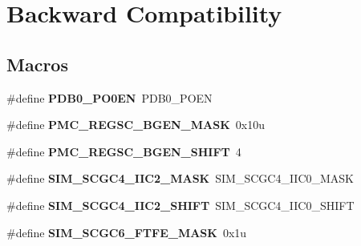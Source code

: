 \hypertarget{group___backward___compatibility___symbols}{}\section{Backward Compatibility}
\label{group___backward___compatibility___symbols}
\subsection*{Macros}
\begin{DoxyCompactItemize}
\item 
\hypertarget{group___backward___compatibility___symbols_gacdf65a1cbab2f9d234709ab34ae9a363}{}\#define {\bfseries P\+D\+B0\+\_\+\+P\+O0\+E\+N}~P\+D\+B0\+\_\+\+P\+O\+E\+N\label{group___backward___compatibility___symbols_gacdf65a1cbab2f9d234709ab34ae9a363}

\item 
\hypertarget{group___backward___compatibility___symbols_ga7e1520a56f4d2675018d5efaa9492f19}{}\#define {\bfseries P\+M\+C\+\_\+\+R\+E\+G\+S\+C\+\_\+\+B\+G\+E\+N\+\_\+\+M\+A\+S\+K}~0x10u\label{group___backward___compatibility___symbols_ga7e1520a56f4d2675018d5efaa9492f19}

\item 
\hypertarget{group___backward___compatibility___symbols_gab43d258e6864ee3a7a728de1d720f6fe}{}\#define {\bfseries P\+M\+C\+\_\+\+R\+E\+G\+S\+C\+\_\+\+B\+G\+E\+N\+\_\+\+S\+H\+I\+F\+T}~4\label{group___backward___compatibility___symbols_gab43d258e6864ee3a7a728de1d720f6fe}

\item 
\hypertarget{group___backward___compatibility___symbols_gae08283ab047e10b1f6d05416b28ae9fc}{}\#define {\bfseries S\+I\+M\+\_\+\+S\+C\+G\+C4\+\_\+\+I\+I\+C2\+\_\+\+M\+A\+S\+K}~S\+I\+M\+\_\+\+S\+C\+G\+C4\+\_\+\+I\+I\+C0\+\_\+\+M\+A\+S\+K\label{group___backward___compatibility___symbols_gae08283ab047e10b1f6d05416b28ae9fc}

\item 
\hypertarget{group___backward___compatibility___symbols_ga862f1dbbfb4baea4e0b0e786e8416f00}{}\#define {\bfseries S\+I\+M\+\_\+\+S\+C\+G\+C4\+\_\+\+I\+I\+C2\+\_\+\+S\+H\+I\+F\+T}~S\+I\+M\+\_\+\+S\+C\+G\+C4\+\_\+\+I\+I\+C0\+\_\+\+S\+H\+I\+F\+T\label{group___backward___compatibility___symbols_ga862f1dbbfb4baea4e0b0e786e8416f00}

\item 
\hypertarget{group___backward___compatibility___symbols_ga6213c97a4029d8279c9e465de2cb2f14}{}\#define {\bfseries S\+I\+M\+\_\+\+S\+C\+G\+C6\+\_\+\+F\+T\+F\+E\+\_\+\+M\+A\+S\+K}~0x1u\label{group___backward___compatibility___symbols_ga6213c97a4029d8279c9e465de2cb2f14}


\end{DoxyCompactItemize}
